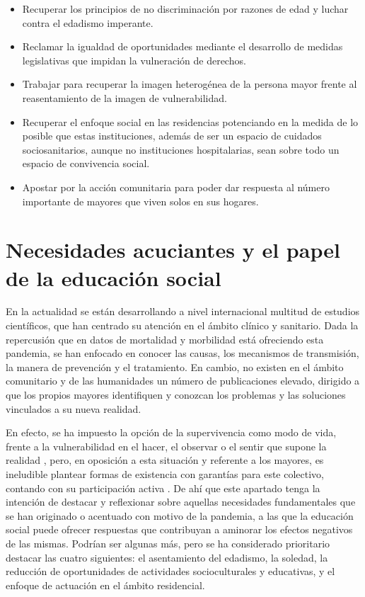 \documentclass{textolivre}
\begin{document}
\begin{itemize}
    \item Recuperar los principios de no discriminación por razones de edad y luchar contra el edadismo imperante.
    \item Reclamar la igualdad de oportunidades mediante el desarrollo de medidas legislativas que impidan la vulneración de derechos.
    \item Trabajar para recuperar la imagen heterogénea de la persona mayor frente al reasentamiento de la imagen de vulnerabilidad.
    \item Recuperar el enfoque social en las residencias potenciando en la medida de lo posible que estas instituciones, además de ser un espacio de cuidados sociosanitarios, aunque no instituciones hospitalarias, sean sobre todo un espacio de convivencia social.
    \item Apostar por la acción comunitaria para poder dar respuesta al número importante de mayores que viven solos en sus hogares.
\end{itemize}

\section{Necesidades acuciantes y el papel de la educación social}
En la actualidad se están desarrollando a nivel internacional multitud de estudios científicos, que han centrado su atención en el ámbito clínico y sanitario. Dada la repercusión que en datos de mortalidad y morbilidad está ofreciendo esta pandemia, se han enfocado en conocer las causas, los mecanismos de transmisión, la manera de prevención y el tratamiento. En cambio, no existen en el ámbito comunitario y de las humanidades un número de publicaciones elevado, dirigido a que los propios mayores identifiquen y conozcan los problemas y las soluciones vinculados a su nueva realidad.

En efecto, se ha impuesto la opción de la supervivencia como modo de vida, frente a la vulnerabilidad en el hacer, el observar o el sentir que supone la realidad \cite{marcos2020}, %
pero, en oposición a esta situación y referente a los mayores, es ineludible plantear formas de existencia con garantías para este colectivo, contando con su participación activa \cite{limon2018}. %
De ahí que este apartado tenga la intención de destacar y reflexionar sobre aquellas necesidades fundamentales que se han originado o acentuado con motivo de la pandemia, a las que la educación social puede ofrecer respuestas que contribuyan a aminorar los efectos negativos de las mismas. Podrían ser algunas más, pero se ha considerado prioritario destacar las cuatro siguientes: el asentamiento del edadismo, la soledad, la reducción de oportunidades de actividades socioculturales y educativas, y el enfoque de actuación en el ámbito residencial.
\end{document}
